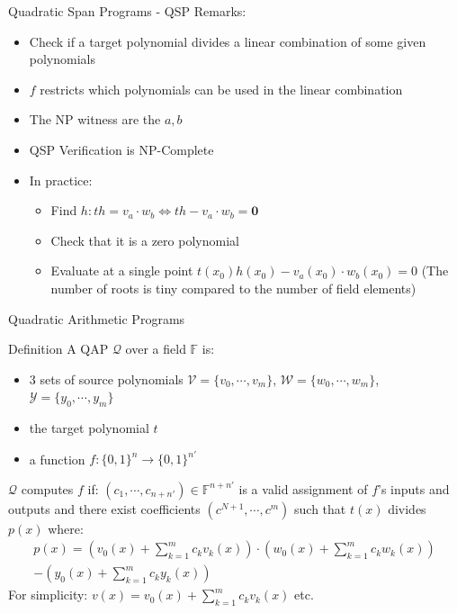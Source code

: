 \documentclass[handouts]{beamer}
\begin{document}
\begin{frame}[allowframebreaks]{Quadratic Span Programs - QSP}
Remarks: 

\begin{itemize}
    \item Check if a target polynomial divides a linear combination of some given polynomials  
    \item $f$ restricts which polynomials can be used in the linear combination  
    \item The NP witness are the $a,b$  
    \item QSP Verification is NP-Complete  
    \item In practice:
    \begin{itemize}
        \item Find $h: th = v_a \cdot w_b \Leftrightarrow th - v_a \cdot w_b = \textbf{0}$       
        \item Check that it is a zero polynomial  
        \item Evaluate at a single point $t(x_0)h(x_0) - v_a(x_0) \cdot w_b(x_0) = 0$ (The number of roots is tiny compared to the number of field elements)
     \end{itemize}
\end{itemize} 
\end{frame}

\begin{frame}[allowframebreaks]{Quadratic Arithmetic Programs}
\begin{block}{Definition}
A QAP $\mathcal{Q}$ over a field $\mathbb{F}$ is:  
\begin{itemize}
    \item 3 sets of source polynomials $\mathcal{V} = \{v_0, \cdots, v_m \}$, $\mathcal{W} = \{ w_0, \cdots, w_m \}$, $\mathcal{Y}  = \{y_0, \cdots, y_m \}$  
    \item the target polynomial $t$  
    \item a function $f : \{0,1\}^n \rightarrow \{0,1\}^{n'}$
\end{itemize}
\end{block}

\framebreak

$\mathcal{Q}$ computes $f$ if:  
 $ (c_1, \cdots ,c_{n+n'}) \in \mathbb{F}^{n+n'}$ is a valid assignment of
$f$’s inputs and outputs and there exist coefficients $(c^{N+1},\cdots,c^m)$ such that $t(x)$ divides $p(x)$ where:
\begin{align*}
p(x) = (v_0(x)+\sum_{k=1}^m c_k v_k(x)) \cdot (w_0(x)+  \sum_{k=1}^m c_k w_k(x))\\ - (y_0(x)+\sum_{k=1}^m c_k y_k(x))
\end{align*}
For simplicity: $v(x)= v_0(x)+\sum_{k=1}^m c_k v_k(x)$ etc.
\end{frame}
\end{document}
